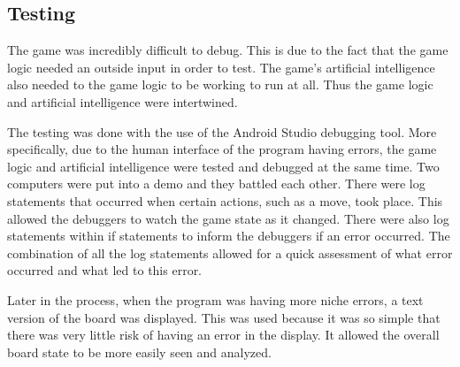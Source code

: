 \documentclass{article}
\begin{document}
\subsection{Testing}
	The game was incredibly difficult to debug. This is due to the fact that the game logic needed an outside input in order to test. The game's artificial intelligence also needed to the game logic to be working to run at all. Thus the game logic and artificial intelligence were intertwined. \par
	The testing was done with the use of the Android Studio debugging tool. More specifically, due to the human interface of the program having errors, the game logic and artificial intelligence were tested and debugged at the same time. Two computers were put into a demo and they battled each other. There were log statements that occurred when certain actions, such as a move, took place. This allowed the debuggers to watch the game state as it changed. There were also log statements within if statements to inform the debuggers if an error occurred. The combination of all the log statements allowed for a quick assessment of what error occurred and what led to this error. \par
	Later in the process, when the program was having more niche errors, a text version of the board was displayed. This was used because it was so simple that there was very little risk of having an error in the display. It allowed the overall board state to be more easily seen and analyzed.
\end{document}

